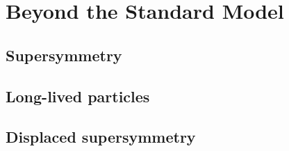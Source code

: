 \section{Beyond the Standard Model}

\subsection{Supersymmetry}

\subsection{Long-lived particles}

\subsection{Displaced supersymmetry}

